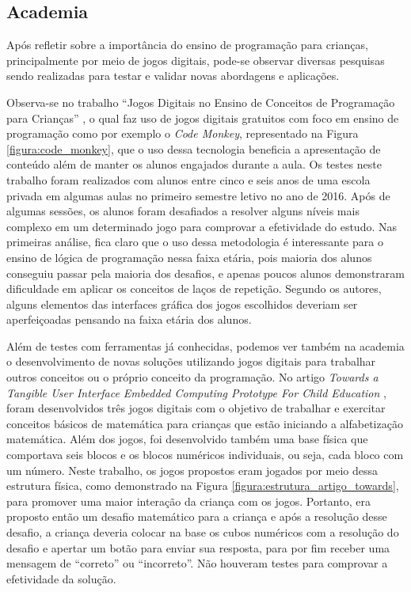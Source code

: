 \subsection{Academia}
Após refletir sobre a importância do ensino de programação para crianças, principalmente por meio de jogos digitais, pode-se observar diversas pesquisas sendo realizadas para testar e validar novas abordagens e aplicações. 

Observa-se no trabalho “Jogos Digitais no Ensino de Conceitos de Programação para Crianças” \cite{tadesco_2016}, o qual faz uso de jogos digitais gratuitos com foco em ensino de programação como por exemplo o \textit{Code Monkey}, representado na Figura \ref{figura:code_monkey}, que o uso dessa tecnologia beneficia a apresentação de conteúdo além de manter os alunos engajados durante a aula. Os testes neste trabalho foram realizados com alunos entre cinco e seis anos de uma escola privada em algumas aulas no primeiro semestre letivo no ano de 2016. Após de algumas sessões, os alunos foram desafiados a resolver alguns níveis mais complexo em um determinado jogo para comprovar a efetividade do estudo. Nas primeiras análise, fica claro que o uso dessa metodologia é  interessante para o ensino de lógica de programação nessa faixa etária, pois maioria dos alunos conseguiu passar pela maioria dos desafios, e apenas poucos alunos demonstraram dificuldade em aplicar os conceitos de laços de repetição. Segundo os autores, alguns elementos das interfaces gráfica dos jogos escolhidos deveriam ser aperfeiçoadas pensando na faixa etária dos alunos.

Além de testes com ferramentas já conhecidas, podemos ver também na academia o desenvolvimento de novas soluções utilizando jogos digitais para trabalhar outros conceitos ou o próprio conceito da programação. No artigo \textit{Towards a Tangible User Interface Embedded Computing Prototype For Child Education} \cite{carneiro_2018}, foram desenvolvidos três jogos digitais com o objetivo de trabalhar e exercitar conceitos básicos de matemática para crianças que estão iniciando a alfabetização matemática. Além dos jogos, foi desenvolvido também uma base física que comportava seis blocos e os blocos numéricos individuais, ou seja, cada bloco com um número. Neste trabalho, os jogos propostos eram jogados por meio dessa estrutura física, como demonstrado na Figura \ref{figura:estrutura_artigo_towards}, para promover uma maior interação da criança com os jogos. Portanto, era proposto então um desafio matemático para a criança e após a resolução desse desafio, a criança deveria colocar na base os cubos numéricos com a resolução do desafio e apertar um botão para enviar sua resposta, para por fim receber uma mensagem de “correto” ou “incorreto”. Não houveram testes para comprovar a efetividade da solução. 

